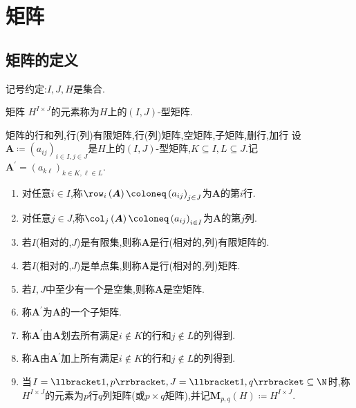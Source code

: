 \chapter{矩阵}

\section{矩阵的定义}

记号约定:$I,J,H$是集合.

\begin{definition}{矩阵}{}
	$H^{I\times J}$的元素称为$H$上的$\left(I,J\right)$-型矩阵.
\end{definition}

\begin{definition}{矩阵的行和列,行(列)有限矩阵,行(列)矩阵,空矩阵,子矩阵,删行,加行}{}
	设$\boldsymbol{A}\coloneq\left(a_{ij}\right)_{i\in I,j\in J}$是$H$上的$\left(I,J\right)$-型矩阵,$K\subseteq I,L\subseteq J$.记$\boldsymbol{A}^{\prime}=\left(a_{k\ell}\right)_{k\in K,\ell\in L}$.
	\begin{enumerate}
		\item 对任意$i\in I$,称$\row_{i}\left(\boldsymbol{A}\right)\coloneq\left(a_{ij}\right)_{j\in J}$为$\boldsymbol{A}$的第$i$行.
		\item 对任意$j\in J$,称$\col_{j}\left(\boldsymbol{A}\right)\coloneq\left(a_{ij}\right)_{i\in I}$为$\boldsymbol{A}$的第$j$列.
		\item 若$I$(相对的,$J$)是有限集,则称$\boldsymbol{A}$是行(相对的,列)有限矩阵的.
		\item 若$I$(相对的,$J$)是单点集,则称$\boldsymbol{A}$是行(相对的,列)矩阵.
		\item 若$I,J$中至少有一个是空集,则称$\boldsymbol{A}$是空矩阵.
		\item 称$\boldsymbol{A}^{\prime}$为$\boldsymbol{A}$的一个子矩阵.
		\item 称$\boldsymbol{A}^{\prime}$由$\boldsymbol{A}$划去所有满足$i\notin K$的行和$j\notin L$的列得到.
		\item 称$\boldsymbol{A}$由$\boldsymbol{A}^{\prime}$加上所有满足$i\notin K$的行和$j\notin L$的列得到.
		\item 当$I=\llbracket 1,p\rrbracket,J=\llbracket 1,q\rrbracket\subseteq\N$时,称$H^{I\times J}$的元素为$p$行$q$列矩阵(或$p\times q$矩阵),并记$\mathbf{M}_{p,q}\left(H\right)\coloneq H^{I\times J}$.
	\end{enumerate}
\end{definition}

